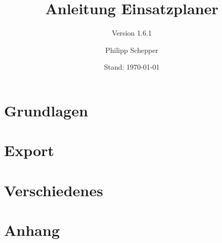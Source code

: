\documentclass[a4paper,ngerman,oneside]{scrbook}
\title{Anleitung Einsatzplaner}
\subtitle{Version 1.6.1}
\author{Philipp Schepper}
\date{Stand: \today}
\begin{document}
\maketitle

\frontmatter
\tableofcontents


\mainmatter
\part{Grundlagen}





\part{Export}


\part{Verschiedenes}



\appendix
\part{Anhang}



\end{document}
